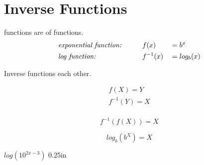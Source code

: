 \section{Inverse Functions}

\begin{tcolorbox}[center,width=6in,colback=white]
     functions are  of  functions.
    \large
    \begin{alignat*}{3}
        &
            \text{\normalsize\itshape exponential function:\quad} 
        &\quad&
            f(x) 
        && 
            = b^x \\ 
        &
            \text{\normalsize\itshape log function:\quad}
        &&
            f^{-1}(x)
        && 
            = log_b(x)
    \end{alignat*}
\end{tcolorbox}

\vspace{-1\onelineskip}
\begin{center}
Inverse functions  each other.
\end{center}

\begin{tcbraster}[ 
    raster columns = 4,
    raster before skip = 0in, raster after skip = 0in,
    raster equal height,
    colback=white,
    top=0in, bottom=0in, boxsep=0in,
    ]
    \begin{tcolorbox}[valign=center,]
        \begin{align*}
            f(X) = Y \\
            f^{-1}(Y) = X \\
        \end{align*}
    \end{tcolorbox}
    \begin{tcolorbox}[valign=center,]
        \begin{center}
        \end{center}
    \end{tcolorbox}
    \begin{tcolorbox}[]
        \[ f^{-1}\left( f(X) \right) = X \] 
    \end{tcolorbox}
    \begin{tcolorbox}[]
        \[ log_b\left( b^{X} \right) = X \] 
    \end{tcolorbox}
\end{tcbraster}

{
    $log\left(10^{2x-3}\right)$ 
}
{0.25in}